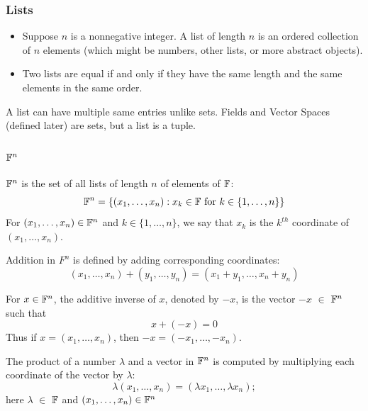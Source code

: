 \subsubsection{Lists}
\begin{definition}
\leavevmode
\begin{itemize}
	\item Suppose $n$ is a nonnegative integer. A list of length $n$ is an ordered collection of $n$ elements (which might be numbers, other lists, or more abstract
	objects).
	\item Two lists are equal if and only if they have the same length and the same
	elements in the same order.
\end{itemize}
\end{definition}
\begin{tcolorbox}[colback=yellow!20, colframe=yellow!80!black, title=My thoughts]
A list can have multiple same entries unlike sets. Fields and Vector Spaces (defined later) are sets, but a list is a tuple.
\end{tcolorbox}
\subsubsection{$\F^n$}
\begin{definition}[$\F^n$, coordinate]
	$\F^n$ is the set of all lists of length $n$ of elements of $\mathbb{F}$:
	\[
	\mathbb{F}^n = \{(x_1, \dots, x_n) : x_k \in \mathbb{F} \text{ for } k \in \{1, \dots, n\}\}
	\]
	For $(x_1, \dots, x_n) \in \mathbb{F}^n$ and $k \in \{1, \dots, n\}$, we say that $x_k$ is the $k^{th}$ coordinate of $(x_1, \dots, x_n)$.
\end{definition}
\begin{definition}[addition in $F^n$]
	Addition in $F^n$ is defined by adding corresponding coordinates:
	\[(x_1, … , x_n) + (y_1, … , y_n) = (x_1 + y_1, … , x_n + y_n)\]
\end{definition}
\begin{definition}
	For $x \in \mathbb{F}^n$, the additive inverse of $x$, denoted by $-x$, is the vector $-x$ $\in$ $\F^n$
	such that
	\[x + (-x) = 0\]
	Thus if $x = (x_1, \dots, x_n)$, then $-x = (-x_1, \dots, -x_n)$.
\end{definition}
\begin{definition}
	The product of a number $\lambda$ and a vector in $\F^n$ is computed by multiplying
	each coordinate of the vector by $\lambda$:
	\[\lambda(x_1, \dots, x_n) = (\lambda x_1, \dots , \lambda x_n);\]
	here $\lambda$ $\in$ $\mathbb{F}$ and $(x_1, \dots , x_n) \in \mathbb{F}^n$
\end{definition}
